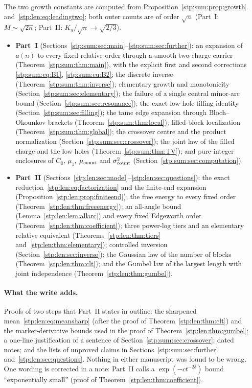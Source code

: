 \documentclass[11pt]{article}
\theoremstyle{remark}\newtheorem{remark}[theorem]{Remark}
\begin{document}
The two growth constants are computed from Proposition~\ref{stp:sum:prop:growth}
and~\eqref{stp:len:eq:leadingtwo}; both outer counts are of order
$\sqrt n$ (Part~I: $M\sim\sqrt{2n}$; Part~II: $K_n/\sqrt n\to\sqrt{2/3}$).

\begin{itemize}
\item \textbf{Part~I} (Sections~\ref{stp:sum:sec:main}--\ref{stp:sum:sec:further}):
an expansion of $a(n)$ to every fixed relative order through a smooth
two-charge carrier (Theorem~\ref{stp:sum:thm:main}), with the explicit first
and second corrections \eqref{stp:sum:eq:B1}, \eqref{stp:sum:eq:B2}; the
discrete inverse (Theorem~\ref{stp:sum:thm:inverse}); elementary growth and
monotonicity (Section~\ref{stp:sum:sec:elementary}); the failure of a single
central minor-arc bound (Section~\ref{stp:sum:sec:resonance}); the exact
low-hole filling identity (Section~\ref{stp:sum:sec:filling}); the tame
edge expansion through Bloch--Okounkov brackets
(Theorem~\ref{stp:sum:thm:local}); filled-block localization
(Theorem~\ref{stp:sum:thm:global}); the crossover centre and the product
normalization (Section~\ref{stp:sum:sec:crossover}); the joint law of the
filled charge and the low holes (Theorem~\ref{stp:sum:thm:TV}); and
pure-integer enclosures of $C_0$, $\mu_1$, $\mu_{\rm count}$ and
$\sigma^2_{\rm count}$ (Section~\ref{stp:sum:sec:computation}).
\item \textbf{Part~II} (Sections~\ref{stp:len:sec:model}--\ref{stp:len:sec:questions}):
the exact reduction~\eqref{stp:len:eq:factorization} and the finite-end
expansion (Proposition~\ref{stp:len:prop:finiteend}); the free energy to
every fixed order (Theorem~\ref{stp:len:thm:freeenergy}); an all-angle
bound (Lemma~\ref{stp:len:lem:allarc}) and every fixed Edgeworth order
(Theorem~\ref{stp:len:thm:coefficient}); three power-log tiers and an
elementary relative equivalent (Theorems~\ref{stp:len:thm:tiers}
and~\ref{stp:len:thm:elementary}); controlled inversion
(Section~\ref{stp:len:sec:inverse}); the Gaussian law of the number of
blocks (Theorem~\ref{stp:len:thm:clt}); and the Gumbel law of the largest
length with joint independence (Theorem~\ref{stp:len:thm:gumbel}).
\end{itemize}

\paragraph{What the write adds.} Proofs of two steps that Part~II states in
outline: the sharpened mean~\eqref{stp:len:eq:meansharp} (after the proof of
Theorem~\ref{stp:len:thm:clt}) and the marker-derivative bounds used in the
proof of Theorem~\ref{stp:len:thm:gumbel}; a one-line justification of a
sentence of Section~\ref{stp:sum:sec:crossover}; dated notes; and the
lists of unproved claims in Sections~\ref{stp:sum:sec:further}
and~\ref{stp:len:sec:questions}. Nothing in either manuscript was found to
be wrong. One wording is corrected in a note: Part~II calls a
$\exp(-ct^{-2\delta})$ bound ``exponentially small'' (proof of
Theorem~\ref{stp:len:thm:coefficient}).
\end{document}
